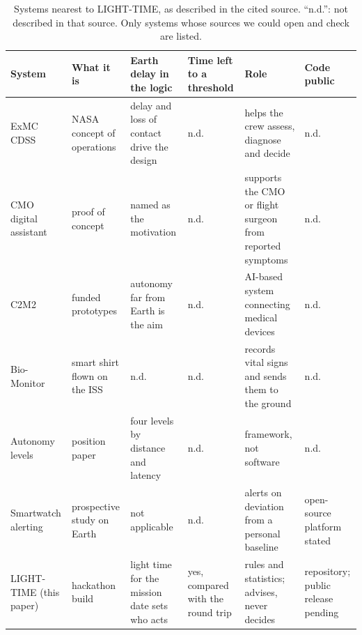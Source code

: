 \begin{table}[t]\centering\footnotesize
\caption{Systems nearest to LIGHT-TIME, as described in the cited source. ``n.d.'': not described in that source. Only systems whose sources we could open and check are listed.}\label{tab:related}
\begin{tabular}{@{}L{0.15\textwidth}L{0.13\textwidth}L{0.18\textwidth}L{0.11\textwidth}L{0.19\textwidth}L{0.11\textwidth}@{}}\toprule
System & What it is & Earth delay in the logic & Time left to a threshold & Role & Code public \\ \midrule
ExMC CDSS~\cite{krihak2021cdss,russell2023cdss} & NASA concept of operations & delay and loss of contact drive the design & n.d. & helps the crew assess, diagnose and decide & n.d. \\
CMO digital assistant~\cite{googleCmoDa2025} & proof of concept & named as the motivation & n.d. & supports the CMO or flight surgeon from reported symptoms & n.d. \\
C2M2~\cite{csaC2M2} & funded prototypes & autonomy far from Earth is the aim & n.d. & AI-based system connecting medical devices & n.d. \\
Bio-Monitor~\cite{csaBioMonitor} & smart shirt flown on the ISS & n.d. & n.d. & records vital signs and sends them to the ground & n.d. \\
Autonomy levels~\cite{cypko2025} & position paper & four levels by distance and latency & n.d. & framework, not software & n.d. \\
Smartwatch alerting~\cite{alavi2022} & prospective study on Earth & not applicable & n.d. & alerts on deviation from a personal baseline & open-source platform stated \\
LIGHT-TIME (this paper) & hackathon build & light time for the mission date sets who acts & yes, compared with the round trip & rules and statistics; advises, never decides & repository; public release pending \\
\bottomrule
\end{tabular}
\end{table}
